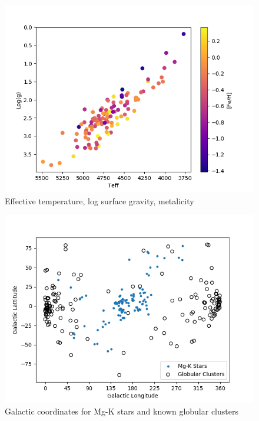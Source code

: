 \documentclass[a4paper,fleqn,usenatbib]{mnras}
\begin{document}
\begin{figure}
	\includegraphics[width=\columnwidth]{loggteffof113.png}
    \caption{Effective temperature, log surface gravity, metalicity}
    \label{tefflogg}
\end{figure}

\begin{figure}
	\includegraphics[width=\columnwidth]{globclustof113.png}
    \caption{Galactic coordinates for Mg-K stars and known globular clusters}
    \label{galcord}
\end{figure}
\end{document}
